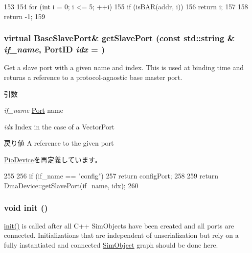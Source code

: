 \begin{DoxyCode}
153     {
154         for (int i = 0; i <= 5; ++i)
155             if (isBAR(addr, i))
156                 return i;
157 
158         return -1;
159     }
\end{DoxyCode}
\hypertarget{classPciDevice_a4edba7d5e567b66fcd93297802a97077}{
\subsubsection[{getSlavePort}]{\setlength{\rightskip}{0pt plus 5cm}virtual {\bf BaseSlavePort}\& getSlavePort (const std::string \& {\em if\_\-name}, \/  {\bf PortID} {\em idx} = {})}}
\label{classPciDevice_a4edba7d5e567b66fcd93297802a97077}
Get a slave port with a given name and index. This is used at binding time and returns a reference to a protocol-\/agnostic base master port.


\begin{DoxyParams}{引数}
\item[{\em if\_\-name}]\hyperlink{classPort}{Port} name \item[{\em idx}]Index in the case of a VectorPort\end{DoxyParams}
\begin{DoxyReturn}{戻り値}
A reference to the given port 
\end{DoxyReturn}


\hyperlink{classPioDevice_ac918a145092d7514ebc6dbd952dceafb}{PioDevice}を再定義しています。


\begin{DoxyCode}
255     {
256         if (if_name == "config") {
257             return configPort;
258         }
259         return DmaDevice::getSlavePort(if_name, idx);
260     }
\end{DoxyCode}
\hypertarget{classPciDevice_a02fd73d861ef2e4aabb38c0c9ff82947}{
\subsubsection[{init}]{\setlength{\rightskip}{0pt plus 5cm}void init ()}}
\label{classPciDevice_a02fd73d861ef2e4aabb38c0c9ff82947}
\hyperlink{classPciDevice_a02fd73d861ef2e4aabb38c0c9ff82947}{init()} is called after all C++ SimObjects have been created and all ports are connected. Initializations that are independent of unserialization but rely on a fully instantiated and connected \hyperlink{classSimObject}{SimObject} graph should be done here. 

